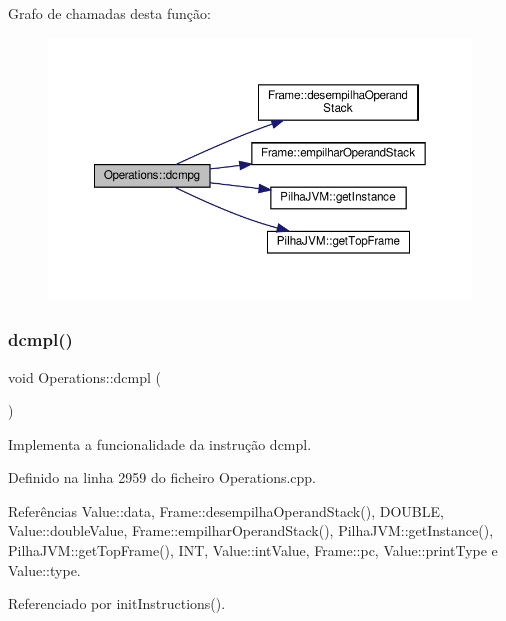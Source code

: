 Grafo de chamadas desta função\+:
\nopagebreak
\begin{figure}[H]
\begin{center}
\leavevmode
\includegraphics[width=350pt]{classOperations_a7c2a5194de7a2a59ada752001b8ece0a_cgraph}
\end{center}
\end{figure}
\mbox{\label{classOperations_a89e1792d8c650c2274352c534cfbd7c0}} 
\subsubsection{\texorpdfstring{dcmpl()}{dcmpl()}}
{\footnotesize\ttfamily void Operations\+::dcmpl (\begin{DoxyParamCaption}{ }\end{DoxyParamCaption})\hspace{0.3cm}{\ttfamily [private]}}



Implementa a funcionalidade da instrução dcmpl. 



Definido na linha 2959 do ficheiro Operations.\+cpp.



Referências Value\+::data, Frame\+::desempilha\+Operand\+Stack(), D\+O\+U\+B\+LE, Value\+::double\+Value, Frame\+::empilhar\+Operand\+Stack(), Pilha\+J\+V\+M\+::get\+Instance(), Pilha\+J\+V\+M\+::get\+Top\+Frame(), I\+NT, Value\+::int\+Value, Frame\+::pc, Value\+::print\+Type e Value\+::type.



Referenciado por init\+Instructions().

